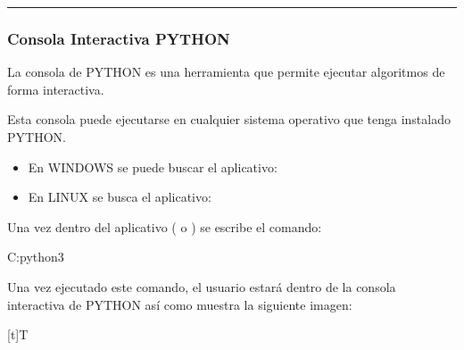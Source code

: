 \documentclass[letterpaper,10pt,spanish]{sphinxmanual}
\let\sphinxpxdimen\pdfpxdimen\else\newdimen\sphinxpxdimen
\begin{document}
\bigskip\hrule\bigskip



\subsubsection{Consola Interactiva PYTHON}
\label{\detokenize{1_guias/10programacion/G1024:consola-interactiva-python}}
\sphinxAtStartPar
La consola de PYTHON es una herramienta que permite ejecutar algoritmos de forma interactiva.

\sphinxAtStartPar
Esta consola puede ejecutarse en cualquier sistema operativo que tenga instalado PYTHON.
\begin{itemize}
\item {} 
\sphinxAtStartPar
En WINDOWS se puede buscar el aplicativo: 

\item {} 
\sphinxAtStartPar
En LINUX se busca el aplicativo: 

\end{itemize}

\sphinxAtStartPar
Una vez dentro del aplicativo ( o ) se escribe el comando: 

\begin{sphinxVerbatim}[commandchars=\\\{\}]
C:python3
\end{sphinxVerbatim}

\sphinxAtStartPar
Una vez ejecutado este comando, el usuario estará dentro de la consola interactiva de PYTHON así como muestra la siguiente imagen:


\begin{savenotes}\sphinxattablestart
\sphinxthistablewithglobalstyle
\centering
\begin{tabulary}{\linewidth}[t]{T}
\sphinxtoprule
\sphinxtableatstartofbodyhook

\begin{sphinxfigure-in-table}
\centering
\capstart
\noindent\sphinxincludegraphics[width=700\sphinxpxdimen]{{image153}.png}
\label{\detokenize{1_guias/10programacion/G1024:id3}}\end{sphinxfigure-in-table}\relax
\\
\sphinxbottomrule
\end{tabulary}
\sphinxtableafterendhook\par
\sphinxattableend\end{savenotes}
\end{document}

